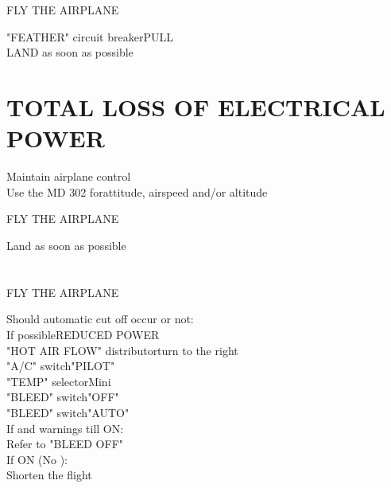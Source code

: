 \documentclass{article}
\newcommand{\fly}{\vspace{-1em}\begin{center}\color{Green}FLY THE AIRPLANE\end{center}\vspace{-1em}}
\newcommand{\warning}[1]{\colorbox{Black}{\color{Orange}{#1}}}
\newcommand{\caution}[1]{\colorbox{Black}{\color{Red}{#1}}}
\begin{document}
\begin{multicols*}{2}
\section*{\color{Red}{ELEC FEATH FAULT}}
\vspace{1em}
\fly
"FEATHER" circuit breaker\dotfill PULL\\
LAND as soon as possible
\vfill\null
\section*{TOTAL LOSS OF ELECTRICAL POWER}
Maintain airplane control\\
Use the MD 302 for\dotfill attitude, airspeed and/or altitude
\fly
Land as soon as possible
\section*{\color{Red}{BLEED TEMP}}
\vspace{1em}
\fly
Should automatic cut off occur or not:\\
If possible\dotfill REDUCED POWER\\
"HOT AIR FLOW" distributor\dotfill turn to the right\\
"A/C" switch\dotfill "PILOT"\\
"TEMP" selector\dotfill Mini\\
"BLEED" switch\dotfill "OFF"\\
"BLEED" switch\dotfill "AUTO"\\
If \caution{BLEED TEMP} and \warning{BLEED OFF} warnings till ON:\\
\hspace*{6mm} Refer to "BLEED OFF"\\
If \caution{BLEED TEMP} ON (No \warning{BLEED OFF}):\\
\hspace*{6mm}Shorten the flight

\end{multicols*}
\end{document}
